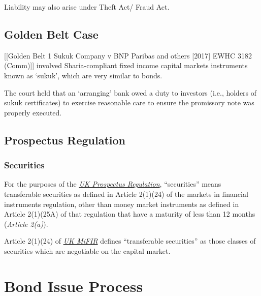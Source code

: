 \documentclass[
]{article}
\begin{document}
Liability may also arise under Theft Act/ Fraud Act.

\hypertarget{golden-belt-case}{%
\subsection{Golden Belt Case}\label{golden-belt-case}}

{[}{[}Golden Belt 1 Sukuk Company v BNP Paribas and others {[}2017{]}
EWHC 3182 (Comm){]}{]} involved Sharia-compliant fixed income capital
markets instruments known as `sukuk', which are very similar to bonds.

The court held that an `arranging' bank owed a duty to investors (i.e.,
holders of sukuk certificates) to exercise reasonable care to ensure the
promissory note was properly executed.

\hypertarget{prospectus-regulation}{%
\subsection{Prospectus Regulation}\label{prospectus-regulation}}

\hypertarget{securities}{%
\subsubsection{Securities}\label{securities}}

For the purposes of the
\emph{\href{https://uk.westlaw.com/w-028-7820?originationContext=document\&transitionType=PLDocumentLink\&contextData=(sc.Default)\&ppcid=20e13a611e13444ebce3d0cd9aea3960}{UK
Prospectus Regulation}}, ``securities'' means transferable securities as
defined in Article 2(1)(24) of the markets in financial instruments
regulation, other than money market instruments as defined in Article
2(1)(25A) of that regulation that have a maturity of less than 12 months
(\emph{Article 2(a)}).

Article 2(1)(24) of
\emph{\href{https://uk.westlaw.com/w-028-5575?originationContext=document\&transitionType=PLDocumentLink\&contextData=(sc.Default)\&ppcid=20e13a611e13444ebce3d0cd9aea3960}{UK
MiFIR}} defines ``transferable securities'' as those classes of
securities which are negotiable on the capital market.

\hypertarget{bond-issue-process}{%
\section{Bond Issue Process}\label{bond-issue-process}}
\end{document}

